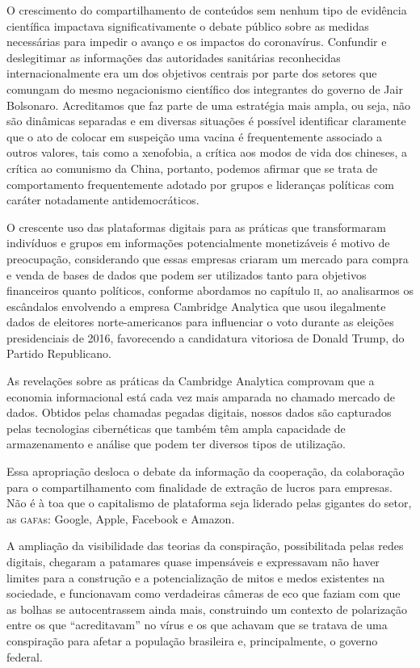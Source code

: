O crescimento do compartilhamento de conteúdos sem nenhum tipo de
evidência científica impactava significativamente o debate público sobre
as medidas necessárias para impedir o avanço e os impactos do
coronavírus. Confundir e deslegitimar as informações das autoridades
sanitárias reconhecidas internacionalmente era um dos objetivos centrais
por parte dos setores que comungam do mesmo negacionismo científico dos
integrantes do governo de Jair Bolsonaro. Acreditamos que faz parte de
uma estratégia mais ampla, ou seja, não são dinâmicas separadas e em
diversas situações é possível identificar claramente que o ato de
colocar em suspeição uma vacina é frequentemente associado a outros
valores, tais como a xenofobia, a crítica aos modos de vida dos
chineses, a crítica ao comunismo da China, portanto, podemos afirmar que
se trata de comportamento frequentemente adotado por grupos e lideranças
políticas com caráter notadamente antidemocráticos.

O crescente uso das plataformas digitais para as práticas que
transformaram indivíduos e grupos em informações potencialmente
monetizáveis é motivo de preocupação, considerando que essas empresas
criaram um mercado para compra e venda de bases de dados que podem ser
utilizados tanto para objetivos financeiros quanto políticos, conforme
abordamos no capítulo \textsc{ii}, ao analisarmos os escândalos envolvendo a
empresa Cambridge Analytica que usou ilegalmente dados de eleitores
norte-americanos para influenciar o voto durante as eleições presidenciais de
2016, favorecendo a candidatura vitoriosa de Donald Trump, do Partido
Republicano.

As revelações sobre as práticas da Cambridge Analytica comprovam que a
economia informacional está cada vez mais amparada no chamado mercado de
dados. Obtidos pelas chamadas pegadas digitais, nossos dados são
capturados pelas tecnologias cibernéticas que também têm ampla
capacidade de armazenamento e análise que podem ter diversos tipos de
utilização.

Essa apropriação desloca o debate da informação da cooperação, da
colaboração para o compartilhamento com finalidade de extração de lucros
para empresas. Não é à toa que o capitalismo de plataforma seja liderado
pelas gigantes do setor, as \textsc{gafa}s: Google, Apple, Facebook e Amazon.

A ampliação da visibilidade das teorias da conspiração, possibilitada
pelas redes digitais, chegaram a patamares quase impensáveis e
expressavam não haver limites para a construção e a potencialização de
mitos e medos existentes na sociedade, e funcionavam como verdadeiras
câmeras de eco que faziam com que as bolhas se autocentrassem ainda
mais, construindo um contexto de polarização entre os que
``acreditavam'' no vírus e os que achavam que se tratava de uma
conspiração para afetar a população brasileira e, principalmente, o
governo federal.

